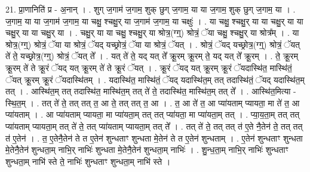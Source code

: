 \documentclass[17pt]{extarticle}
\begin{document}
21. प्रा॒णानिति॑ प्र - अ॒नान् । . शुग् ज॒गाम॑ ज॒गाम॒ शुक् छुग् ज॒गाम॒ या या ज॒गाम॒ शुक् छुग् ज॒गाम॒ या । . ज॒गाम॒ या या ज॒गाम॑ ज॒गाम॒ या चक्षु॒ श्चक्षु॒र् या ज॒गाम॑ ज॒गाम॒ या चक्षुः॑ । . या चक्षु॒ श्चक्षु॒र् या या चक्षु॒र् या या चक्षु॒र् या या चक्षु॒र् या । . चक्षु॒र् या या चक्षु॒ श्चक्षु॒र् या श्रोत्र॒(ग्ग्॒) श्रोत्रं॒ ॅया चक्षु॒ श्चक्षु॒र् या श्रोत्र᳚म् । . या श्रोत्र॒(ग्ग्॒) श्रोत्रं॒ ॅया या श्रोत्रं॒ ॅयद् यच्छ्रोत्रं॒ ॅया या श्रोत्रं॒ ॅयत् । . श्रोत्रं॒ ॅयद् यच्छ्रोत्र॒(ग्ग्॒) श्रोत्रं॒ ॅयत् ते॑ ते॒ यच्छ्रोत्र॒(ग्ग्॒) श्रोत्रं॒ ॅयत् ते᳚ । . यत् ते॑ ते॒ यद् यत् ते᳚ क्रू॒रम् क्रू॒रम् ते॒ यद् यत् ते᳚ क्रू॒रम् । . ते॒ क्रू॒रम् क्रू॒रम् ते॑ ते क्रू॒रं ॅयद् यत् क्रू॒रम् ते॑ ते क्रू॒रं ॅयत् । . क्रू॒रं ॅयद् यत् क्रू॒रम् क्रू॒रं ॅयदास्थि॑त॒ मास्थि॑तं॒ ॅयत् क्रू॒रम् क्रू॒रं ॅयदास्थि॑तम् । . यदास्थि॑त॒ मास्थि॑तं॒ ॅयद् यदास्थि॑त॒म् तत् तदास्थि॑तं॒ ॅयद् यदास्थि॑त॒म् तत् । . आस्थि॑त॒म् तत् तदास्थि॑त॒ मास्थि॑त॒म् तत् ते॑ ते॒ तदास्थि॑त॒ मास्थि॑त॒म् तत् ते᳚ । . आस्थि॑त॒मित्या - स्थि॒त॒म् । . तत् ते॑ ते॒ तत् तत् त॒ आ ते॒ तत् तत् त॒ आ । . त॒ आ ते॑ त॒ आ प्या॑यताम् प्यायता॒ मा ते॑ त॒ आ प्या॑यताम् । . आ प्या॑यताम् प्यायता॒ मा प्या॑यता॒म् तत् तत् प्या॑यता॒ मा प्या॑यता॒म् तत् । . प्या॒य॒ता॒म् तत् तत् प्या॑यताम् प्यायता॒म् तत् ते॑ ते॒ तत् प्या॑यताम् प्यायता॒म् तत् ते᳚ । . तत् ते॑ ते॒ तत् तत् त॑ ए॒ते नै॒तेन॑ ते॒ तत् तत् त॑ ए॒तेन॑ । . त॒ ए॒तेनै॒तेन॑ ते त ए॒तेन॑ शुन्धताꣳ शुन्धता मे॒तेन॑ ते त ए॒तेन॑ शुन्धताम् । . ए॒तेन॑ शुन्धताꣳ शुन्धता मे॒तेनै॒तेन॑ शुन्धता॒म् नाभि॒र् नाभिः॑ शुन्धता मे॒तेनै॒तेन॑ शुन्धता॒म् नाभिः॑ । . शु॒न्ध॒ता॒म् नाभि॒र् नाभिः॑ शुन्धताꣳ शुन्धता॒म् नाभि॑ स्ते ते॒ नाभिः॑ शुन्धताꣳ शुन्धता॒म् नाभि॑ स्ते । \newline
\end{document}
